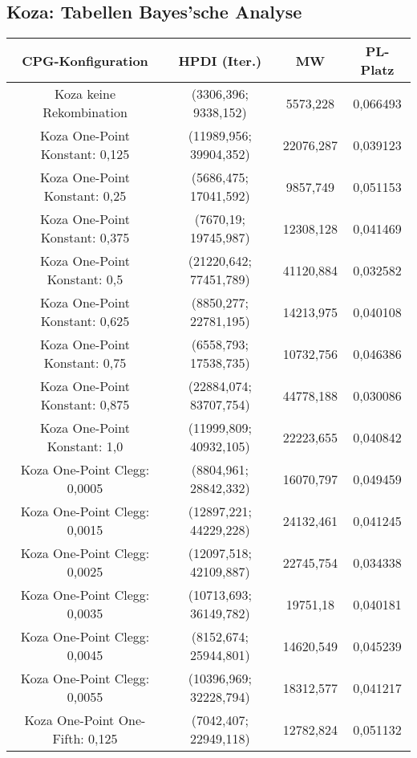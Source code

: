 \subsection{Koza: Tabellen Bayes'sche Analyse}
\label{subsec:appendixTabellenBayesKoza}
\begin{table}[H]
	\centering
	\begin{tabular}{c | c | c | c}
		\textbf{CPG-Konfiguration} & \textbf{HPDI (Iter.)} & \textbf{MW} & \textbf{PL-Platz}\\
		\hline
		Koza keine Rekombination & (3306,396; 9338,152) & 5573,228 & 0,066493\\
		\hline
		Koza One-Point Konstant: 0,125 & (11989,956; 39904,352) & 22076,287 & 0,039123\\
		\hline
		Koza One-Point Konstant: 0,25 & (5686,475; 17041,592) & 9857,749 & 0,051153\\
		\hline
		Koza One-Point Konstant: 0,375 & (7670,19; 19745,987) & 12308,128 & 0,041469\\
		\hline
		Koza One-Point Konstant: 0,5 & (21220,642; 77451,789) & 41120,884 & 0,032582\\
		\hline
		Koza One-Point Konstant: 0,625 & (8850,277; 22781,195) & 14213,975 & 0,040108\\
		\hline
		Koza One-Point Konstant: 0,75 & (6558,793; 17538,735) & 10732,756 & 0,046386\\
		\hline
		Koza One-Point Konstant: 0,875 & (22884,074; 83707,754) & 44778,188 & 0,030086\\
		\hline
		Koza One-Point Konstant: 1,0 & (11999,809; 40932,105) & 22223,655 & 0,040842\\
		\hline
		Koza One-Point Clegg: 0,0005 & (8804,961; 28842,332) & 16070,797 & 0,049459\\
		\hline
		Koza One-Point Clegg: 0,0015 & (12897,221; 44229,228) & 24132,461 & 0,041245\\
		\hline
		Koza One-Point Clegg: 0,0025 & (12097,518; 42109,887) & 22745,754 & 0,034338\\
		\hline
		Koza One-Point Clegg: 0,0035 & (10713,693; 36149,782) & 19751,18 & 0,040181\\
		\hline
		Koza One-Point Clegg: 0,0045 & (8152,674; 25944,801) & 14620,549 & 0,045239\\
		\hline
		Koza One-Point Clegg: 0,0055 & (10396,969; 32228,794) & 18312,577 & 0,041217\\
		\hline
		Koza One-Point One-Fifth: 0,125 & (7042,407; 22949,118) & 12782,824 & 0,051132\\
		\hline

\end{tabular}
\end{table}
